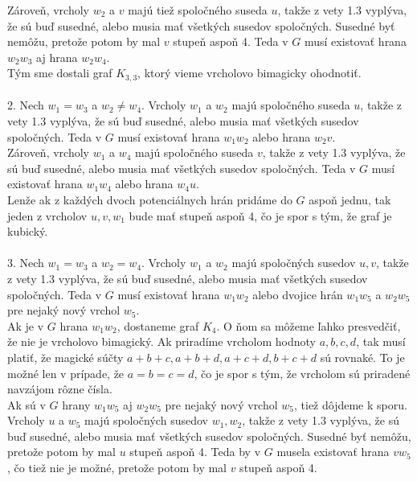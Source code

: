 \documentclass[12pt]{article}
\begin{document}
Zároveň, vrcholy $w_2$ a $v$ majú tiež spoločného suseda $u$, takže z vety 1.3 vyplýva, že sú buď susedné, alebo musia mať všetkých susedov spoločných. Susedné byť nemôžu, pretože potom by mal $v$ stupeň aspoň 4. Teda v $G$ musí existovať hrana $w_2 w_3$ aj hrana $w_2 w_4$. \\

Tým sme dostali graf $K_{3,3}$, ktorý vieme vrcholovo bimagicky ohodnotiť. \\\\

2. Nech $w_1 = w_3$ a $w_2 \neq w_4$. Vrcholy $w_1$ a $w_2$ majú spoločného suseda $u$, takže z vety 1.3 vyplýva, že sú buď susedné, alebo musia mať všetkých susedov spoločných. Teda v $G$ musí existovať hrana $w_1 w_2$ alebo hrana $w_2 v$. \\

Zároveň, vrcholy $w_1$ a $w_4$ majú spoločného suseda $v$, takže z vety 1.3 vyplýva, že sú buď susedné, alebo musia mať všetkých susedov spoločných. Teda v $G$ musí existovať hrana $w_1 w_4$ alebo hrana $w_4 u$. \\

Lenže ak z každých dvoch potenciálnych hrán pridáme do $G$ aspoň jednu, tak jeden z vrcholov $u, v, w_1$ bude mať stupeň aspoň 4, čo je spor s tým, že graf je kubický. \\\\

3. Nech $w_1 = w_3$ a $w_2 = w_4$. Vrcholy $w_1$ a $w_2$ majú spoločných susedov $u,v$, takže z vety 1.3 vyplýva, že sú buď susedné, alebo musia mať všetkých susedov spoločných. Teda v $G$ musí existovať hrana $w_1 w_2$ alebo dvojice hrán $w_1 w_5$ a $w_2 w_5$ pre nejaký nový vrchol $w_5$. \\

Ak je v $G$ hrana $w_1 w_2$, dostaneme graf $K_4$. O ňom sa môžeme ľahko presvedčiť, že nie je vrcholovo bimagický. Ak priradíme vrcholom hodnoty $a,b,c,d$, tak musí platiť, že magické súčty $a+b+c, a+b+d, a+c+d, b+c+d$ sú rovnaké. To je možné len v prípade, že $a = b = c = d$, čo je spor s tým, že vrcholom sú priradené navzájom rôzne čísla. \\

Ak sú v $G$ hrany $w_1 w_5$ aj $w_2 w_5$ pre nejaký nový vrchol $w_5$, tiež dôjdeme k sporu. Vrcholy $u$ a $w_5$ majú spoločných susedov $w_1, w_2$, takže z vety 1.3 vyplýva, že sú buď susedné, alebo musia mať všetkých susedov spoločných. Susedné byť nemôžu, pretože potom by mal $u$ stupeň aspoň 4. Teda by v $G$ musela existovať hrana $v w_5$, čo tiež nie je možné, pretože potom by mal $v$ stupeň aspoň 4. \\\\
\end{document}
